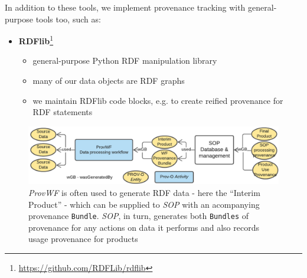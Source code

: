 \documentclass[letterpaper,twocolumn,10pt]{article}
\begin{document}
In addition to these tools, we implement provenance tracking with general-purpose tools too, such as:

\begin{itemize}
  \item \textbf{RDFlib}\footnote{\url{https://github.com/RDFLib/rdflib}}
  \begin{itemize}
    \item general-purpose Python RDF manipulation library
    \item many of our data objects are RDF graphs
    \item we maintain RDFlib code blocks, e.g. to create reified provenance for RDF statements
  \end{itemize}
\end{itemize}  


\begin{figure}
  \label{fig:provwf-to-sop}
  \begin{center}
    \includegraphics[width=\textwidth]{images/provwf-to-sop.png}
  \end{center}
  \caption{\textit{ProvWF} is often used to generate RDF data - here the ``Interim Product'' - which can be supplied to \textit{SOP} with an acompanying provenance \texttt{Bundle}. \textit{SOP}, in turn, generates both \texttt{Bundles} of provenance for any actions on data it performs and also records usage provenance for products}
\end{figure}
\end{document}
